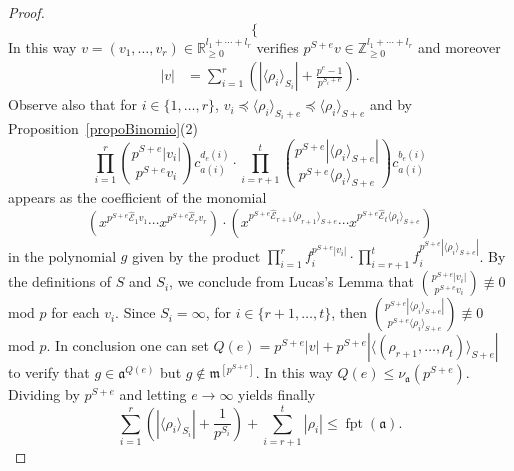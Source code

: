 \documentclass[12pt]{amsart}
\theoremstyle{definition}
\newtheorem{remark}[theorem]{Remark}
\numberwithin{equation}{subsection}
\DeclareMathOperator{\fpt}{fpt}
\newcommand{\ZZ}{\mathbb{Z}}
\newcommand{\RR}{\mathbb{R}}
\newcommand{\m}{\mathfrak{m}}
\newcommand{\fa}{\mathfrak{a}}
\newcommand{\SP}{\mathcal{P}}
\newcommand{\Bf}{\boldsymbol{f}}
\newcommand{\E}{\mathcal{E}}
\renewcommand{\!}[1]{{\color{red}\text{\Huge$\star$ }#1}}
\begin{document}
\begin{proof}
\[\begin{cases}
\end{cases}
\] 
In this way $v =(v_1,\ldots,v_r) \in \RR_{\geq 0}^{l_1+\cdots+l_r}$ verifies $p^{S+e}v \in \ZZ_{\geq 0}^{l_1+\cdots+l_r}$ and moreover
\begin{align*}
|v|&=\sum_{i=1}^{r}\left(|\langle \rho_i \rangle_{S_i}|+\frac{p^{e}-1}{p^{S_i+e}} \right).
\end{align*}
Observe also that  for $i\in\{1,\ldots,r\}$, $v_i \preceq \langle \rho_i \rangle_{S_i+e} \preceq \langle \rho_i \rangle_{S+e}$ and by Proposition~\ref{propoBinomio}(2) 
\[\prod_{i=1}^{r}\binom{p^{S+e}|v_i|}{p^{S+e}v_i}c_{a(i)}^{d_{e}(i)} \cdot  \prod_{i=r+1}^{t}\binom{p^{S+e}|\langle \rho_i \rangle_{S+e}|}{p^{S+e}\langle \rho_i \rangle_{S+e}}c_{a(i)}^{b_{e}(i)}
\]
appears as the coefficient of the monomial 
\[(x^{p^{S+e}  \widehat{\E}_1 v_1}  \cdots  x^{p^{S+e}\widehat{\E}_r v_r})\cdot (  x^{p^{S+e}\widehat{\E}_{r+1} \langle \rho_{r+1} \rangle_{S+e}}\cdots   x^{p^{S+e}\widehat{\E}_t \langle \rho_t \rangle_{S+e} })
\]
in the polynomial $g$ given by the product 
$\prod_{i=1}^{r} f_i^{p^{S+e}|v_i|} \cdot \prod_{i =r+1}^t  f_i^{p^{S+e}|\langle \rho_i \rangle_{S+e}|}$. By the definitions of  $S$ and $S_i$, we conclude from Lucas's Lemma that $\binom{p^{S+e}|v_i|}{p^{S+e}v_i} \not \equiv 0$ mod $p$ for each $v_i$. Since $S_i=\infty$, 
for $ i \in \{r+1,\ldots, t\}$, then $\binom{p^{S+e}|\langle \rho_i \rangle_{S+e}|}{p^{S+e}\langle \rho_i \rangle_{S+e}} \not \equiv 0$ mod $p$. In conclusion one can set $Q(e)=p^{S+e} |v| +p^{S+e}|\langle( \rho_{r+1},\ldots, \rho_t) \rangle_{S+e}|$ to verify that 
$g \in  \fa^{Q(e)}$ but $g \notin \m^{[p^{S+e}]}$. In this way $Q(e)\leq \nu_{\fa}(p^{S+e})$. Dividing by $p^{S+e}$ and letting $e \rightarrow \infty$ yields finally  
\[\sum_{i=1}^{r}\left(|\langle \rho_i \rangle_{S_i}|+  \frac{1}{p^{S_i}}\right) + \sum_{i=r+1}^t|\rho_i| \leq \fpt(\fa).
\]
\end{proof}
\end{document}
